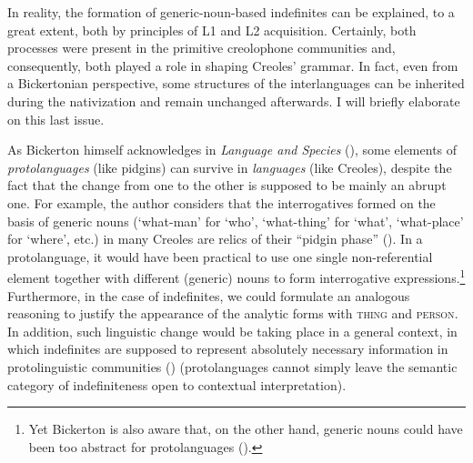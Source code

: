 \documentclass[output=paper,colorlinks,citecolor=brown]{langscibook}
\begin{document}
In reality, the formation of generic-noun-based indefinites can be explained, to a great extent, both by principles of L1 and L2 acquisition. Certainly, both processes were present in the primitive creolophone communities and, consequently, both played a role in shaping Creoles’ grammar. In fact, even from a Bickertonian perspective, some structures of the interlanguages can be inherited during the nativization and remain unchanged afterwards. I will briefly elaborate on this last issue.

As Bickerton himself acknowledges in \textit{Language and Species} (\citeyear[][164--196]{Bickerton1990}), some elements of \textit{protolanguages} (like pidgins) can survive in \textit{languages} (like Creoles), despite the fact that the change from one to the other is supposed to be mainly an abrupt one. For example, the author considers that the interrogatives formed on the basis of generic nouns (‘what-man’ for ‘who’, ‘what-thing’ for ‘what’, ‘what-place’ for ‘where’, etc.) in many Creoles are relics of their “pidgin phase” (\citeyear[][183]{Bickerton1990}). In a protolanguage, it would have been practical to use one single non-referential element together with different (generic) nouns to form interrogative expressions.\footnote{Yet Bickerton is also aware that, on the other hand, generic nouns could have been too abstract for protolanguages (\citeyear[][182]{Bickerton1990}).} Furthermore, in the case of indefinites, we could formulate an analogous reasoning to justify the appearance of the analytic forms with \textsc{thing} and \textsc{person}. In addition, such linguistic change would be taking place in a general context, in which indefinites are supposed to represent absolutely necessary information in protolinguistic communities (\citeyear[][184--185]{Bickerton1990}) (protolanguages cannot simply leave the semantic category of indefiniteness open to contextual interpretation).
\end{document}
